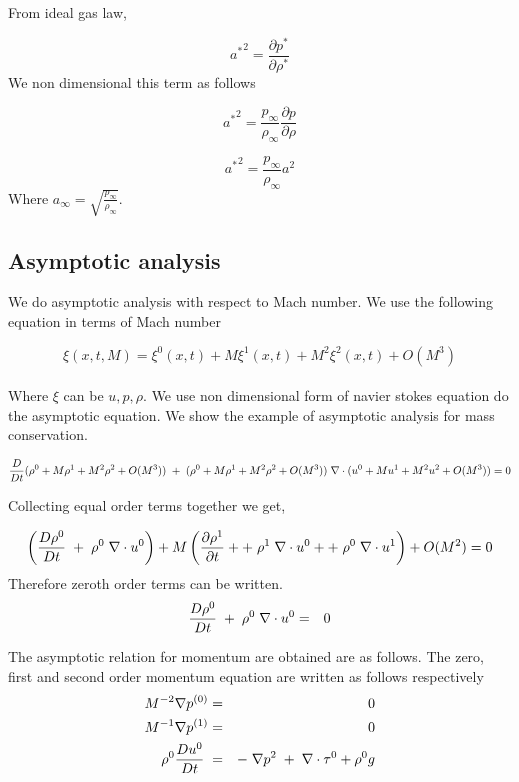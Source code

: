 \noindent From ideal gas law, 

$${a^*}^2= \frac{\partial p^*}{\partial \rho^*}$$ We non dimensional this term as follows 

$${a^*}^2= \frac{p_\infty}{\rho_\infty}\frac{\partial p}{\partial \rho}$$

$${a^*}^2= \frac{p_\infty}{\rho_\infty}a^2$$ Where $a_\infty = \sqrt{\frac{p_\infty}{\rho_\infty}}$.

\subsection{Asymptotic analysis}
We do asymptotic analysis with respect to Mach number.
We use the following equation in terms of Mach number

$$\xi(x,t,M)=\xi^0(x,t)+M \xi^1(x,t)+M^2 \xi^2(x,t)+O(M^3)$$ \\

\noindent Where $\xi$ can be $u,p,\rho$. We use non dimensional form of navier stokes equation do the asymptotic equation. 
We show the example of asymptotic analysis for mass conservation. 

$$\frac{D}{D t}(\rho^0+M \rho^1+M^2 \rho^2+O(M^3))\hspace{1mm}+\hspace{1mm}(\rho^0+M \rho^1+M^2 \rho^2+O(M^3)) \hspace{1mm}\nabla \cdot (u^0+M u^1+M^2 u^2+O(M^3)) = 0 $$

Collecting equal order terms together we get,

$$\left(\frac{D \rho^0}{D t}\hspace{1mm}+\hspace{1mm}\rho^0 \hspace{1mm}\nabla \cdot u^0\right) + M \left(\frac{\partial \rho^1 }{\partial t}+ +\hspace{1mm}\rho^1 \hspace{1mm}\nabla \cdot u^0++\hspace{1mm}\rho^0 \hspace{1mm}\nabla \cdot u^1\right) + O(M^2) = 0 $$ Therefore zeroth order terms can be written.
\begin{eqnarray}
\frac{D \rho^0}{D t}\hspace{1mm}+\hspace{1mm}\rho^0 \hspace{1mm}\nabla \cdot u^0 &=& 0
\end{eqnarray}

\noindent The asymptotic relation for momentum are obtained are as follows.  The zero, first and second order momentum equation are written as follows respectively
\begin{eqnarray}
M^{-2}\nabla p^{(0)} &=& 0\\
M^{-1}\nabla p^{(1)} &=& 0\\
\rho^0 \frac{D u^0}{D t} \hspace{1mm} &=& -\hspace{1mm}\nabla p^2\hspace{1mm}+\hspace{1mm}\nabla \cdot \tau^0 + \rho^0 g
\end{eqnarray}

